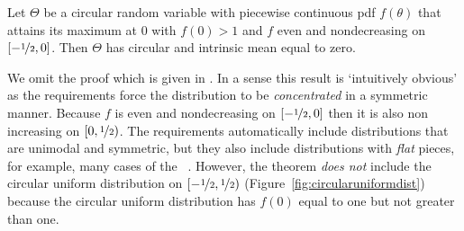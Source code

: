 \documentclass[journal]{IEEEtran}
\begin{document}
\begin{theorem}\label{thm:unimean}
Let $\Theta$ be a circular random variable with piecewise continuous pdf $f(\theta)$ that attains its maximum at $0$ with $f(0) > 1$ and $f$ even and nondecreasing on $[-\nicefrac{1}{2}, 0]$. Then $\Theta$ has circular and intrinsic mean equal to zero.\end{theorem}
We omit the proof which is given in \cite[p.~74]{McKilliam2010thesis}. In a sense this result is `intuitively obvious' as the requirements force the distribution to be \emph{concentrated} in a symmetric manner.  Because $f$ is even and nondecreasing on $[-\nicefrac{1}{2}, 0]$ then it is also non increasing on $[0, \nicefrac{1}{2})$. %
The requirements automatically include distributions that are unimodal and symmetric, but they also include distributions with \emph{flat} pieces, for example, many cases of the  \cite{Mardia_directional_statistics,Fisher1993}~\cite[Sec. 5.5]{McKilliam2010thesis}.  However, the theorem \emph{does not} include the circular uniform distribution on $[-\nicefrac{1}{2}, \nicefrac{1}{2})$ (Figure~\ref{fig:circularuniformdist}) because the circular uniform distribution has $f(0)$ equal to one but not greater than one.  %


\end{document}

